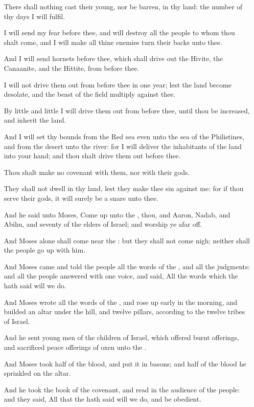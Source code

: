\Verse There shall nothing cast their young, nor be barren, in thy land: the number of thy days I will fulfil.

\Verse I will send my fear before thee, and will destroy all the people to whom thou shalt come, and I will make all thine enemies turn their backs unto thee.

\Verse And I will send hornets before thee, which shall drive out the Hivite, the Canaanite, and the Hittite, from before thee.

\Verse I will not drive them out from before thee in one year; lest the land become desolate, and the beast of the field multiply against thee.

\Verse By little and little I will drive them out from before thee, until thou be increased, and inherit the land.

\Verse And I will set thy bounds from the Red sea even unto the sea of the Philistines, and from the desert unto the river: for I will deliver the inhabitants of the land into your hand; and thou shalt drive them out before thee.

\Verse Thou shalt make no covenant with them, nor with their gods.

\Verse They shall not dwell in thy land, lest they make thee sin against me: for if thou serve their gods, it will surely be a snare unto thee.

\Chapter
\Verse And he said unto Moses, Come up unto the \LORD, thou, and Aaron, Nadab, and Abihu, and seventy of the elders of Israel; and worship ye afar off.

\Verse And Moses alone shall come near the \LORD: but they shall not come nigh; neither shall the people go up with him.

\Verse And Moses came and told the people all the words of the \LORD, and all the judgments: and all the people answered with one voice, and said, All the words which the \LORD hath said will we do.

\Verse And Moses wrote all the words of the \LORD, and rose up early in the morning, and builded an altar under the hill, and twelve pillars, according to the twelve tribes of Israel.

\Verse And he sent young men of the children of Israel, which offered burnt offerings, and sacrificed peace offerings of oxen unto the \LORD.

\Verse And Moses took half of the blood, and put it in basons; and half of the blood he sprinkled on the altar.

\Verse And he took the book of the covenant, and read in the audience of the people: and they said, All that the \LORD hath said will we do, and be obedient.

